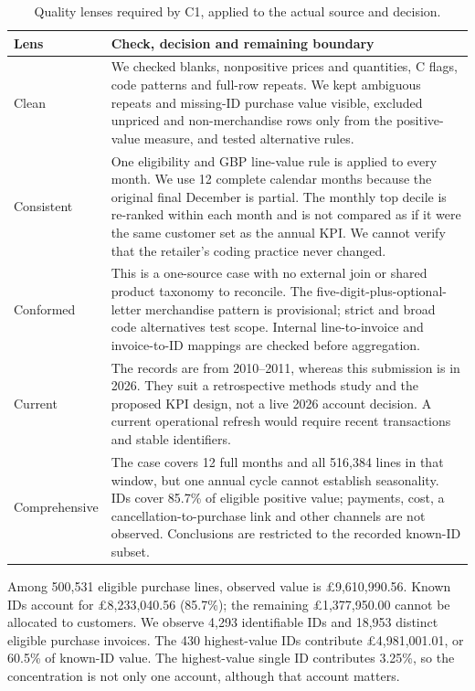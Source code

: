 \documentclass[10pt,a4paper]{article}
\newcommand{\sectionhead}[1]{\Needspace{8\baselineskip}\vspace{0.33em}{\large\bfseries\color{navy}#1}\par\vspace{0.08em}}
\newcommand{\subhead}[1]{\vspace{0.15em}{\bfseries #1}\par}
\begin{document}
\subhead{The Five Cs on this case}
\begin{table}[H]\centering\small
\caption{Quality lenses required by C1, applied to the actual source and decision.}
\begin{tabularx}{\linewidth}{@{}p{2.4cm}X@{}}\toprule
Lens & Check, decision and remaining boundary \\\midrule
Clean & We checked blanks, nonpositive prices and quantities, C flags, code patterns and full-row repeats. We kept ambiguous repeats and missing-ID purchase value visible, excluded unpriced and non-merchandise rows only from the positive-value measure, and tested alternative rules. \\
Consistent & One eligibility and GBP line-value rule is applied to every month. We use 12 complete calendar months because the original final December is partial. The monthly top decile is re-ranked within each month and is not compared as if it were the same customer set as the annual KPI. We cannot verify that the retailer's coding practice never changed. \\
Conformed & This is a one-source case with no external join or shared product taxonomy to reconcile. The five-digit-plus-optional-letter merchandise pattern is provisional; strict and broad code alternatives test scope. Internal line-to-invoice and invoice-to-ID mappings are checked before aggregation. \\
Current & The records are from 2010--2011, whereas this submission is in 2026. They suit a retrospective methods study and the proposed KPI design, not a live 2026 account decision. A current operational refresh would require recent transactions and stable identifiers. \\
Comprehensive & The case covers 12 full months and all 516,384 lines in that window, but one annual cycle cannot establish seasonality. IDs cover 85.7\% of eligible positive value; payments, cost, a cancellation-to-purchase link and other channels are not observed. Conclusions are restricted to the recorded known-ID subset. \\
\bottomrule\end{tabularx}
\end{table}

\sectionhead{5\quad Diagnostic EDA on the validated population}
Among 500,531 eligible purchase lines, observed value is \pounds9,610,990.56. Known IDs account for \pounds8,233,040.56 (85.7\%); the remaining \pounds1,377,950.00 cannot be allocated to customers. We observe 4,293 identifiable IDs and 18,953 distinct eligible purchase invoices. The 430 highest-value IDs contribute \pounds4,981,001.01, or 60.5\% of known-ID value. The highest-value single ID contributes 3.25\%, so the concentration is not only one account, although that account matters.
\end{document}
